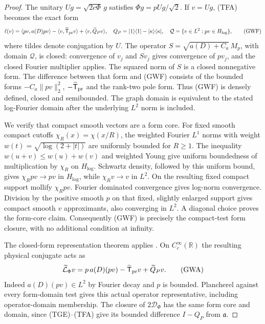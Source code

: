 \documentclass[11pt]{article}
\theoremstyle{remark}\newtheorem{remark}[theorem]{Remark}
\newcommand{\R}{\mathbb R}
\begin{document}
\begin{proof}
The unitary $Ug=\sqrt{2c\Phi}\,g$ satisfies
$\Phi g=pUg/\sqrt2$. If $v=Ug$, (TFA) becomes the exact form
\[
 \ell(v)=\langle pv,a(D)pv\rangle
       -\langle v,\widetilde{\mathsf T}_{\rm pr}v\rangle
       +\langle v,\widetilde Q_Pv\rangle,
 \quad Q_P=|1\rangle\langle1|-|\kappa\rangle\langle\kappa|,
 \quad \mathcal Q=\{v\in L^2:pv\in H_{\log}\},             \tag{GWF}
\]
where tildes denote conjugation by $U$.
The operator $S=\sqrt{a(D)+C_a}\,M_p$, with domain $\mathcal Q$,
is closed: convergence of $v_j$ and $Sv_j$ gives convergence of
$pv_j$, and the closed Fourier multiplier applies. The squared
norm of $S$ is a closed nonnegative form. The difference between
that form and (GWF) consists of the bounded forms
$-C_a\|pv\|_2^2$, $-\widetilde{\mathsf T}_{\rm pr}$ and the
rank-two pole form. Thus (GWF) is densely defined, closed and
semibounded. The graph domain is equivalent to the stated
log-Fourier domain after the underlying $L^2$ norm is included.

We verify that compact smooth vectors are a form core.
For fixed smooth compact cutoffs $\chi_R(x)=\chi(x/R)$,
the weighted Fourier $L^1$ norms with weight
$w(t)=\sqrt{\log(2+|t|)}$ are uniformly bounded for $R\ge1$.
The inequality $w(u+v)\le w(u)+w(v)$ and weighted Young
give uniform boundedness of multiplication by $\chi_R$ on
$H_{\log}$. Schwartz density, followed by this uniform bound,
gives $\chi_Rpv\to pv$ in $H_{\log}$, while $\chi_Rv\to v$
in $L^2$. On the resulting fixed compact support mollify
$\chi_Rpv$. Fourier dominated convergence gives log-norm
convergence. Division by the positive smooth $p$ on that fixed,
slightly enlarged support gives compact smooth $v$ approximants,
also converging in $L^2$. A diagonal choice proves the form-core
claim. Consequently (GWF) is precisely the compact-test form
closure, with no additional condition at infinity.

The closed-form representation theorem applies
\cite[Theorem 2.13, pp.~71--72]{TeschlQM2009}.
On $C_c^\infty(\R)$ the resulting physical conjugate acts as
\[
 \widetilde{\mathcal L}_\Phi v
   =p\,a(D)(pv)-\widetilde{\mathsf T}_{\rm pr}v
                                    +\widetilde Q_Pv.      \tag{GWA}
\]
Indeed $a(D)(pv)\in L^2$ by Fourier decay and $p$ is bounded.
Plancherel against every form-domain test gives this actual
operator representative, including operator-domain membership.
The closure of $2\mathcal D_\Phi$ has the same form core and
domain, since (TGE)--(TFA) give its bounded difference
$I-Q_P$ from $\mathfrak a$.


\end{proof}
\end{document}

